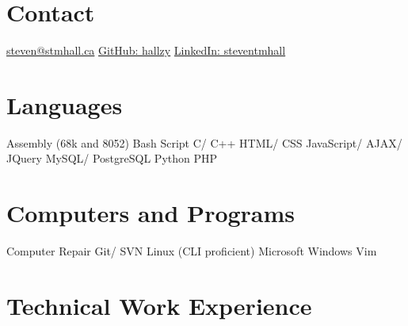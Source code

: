 \documentclass[]{friggeri-cv} %
\begin{document}


\begin{aside} %
\section{Contact}
\href{mailto:steven@stmhall.ca}{steven@stmhall.ca}
\href{http://github.com/hallzy}{GitHub: hallzy}
\href{https://www.linkedin.com/in/steventmhall}{LinkedIn: steventmhall}
\section{Languages}
Assembly (68k and 8052)
Bash Script
C/ C++
HTML/ CSS
JavaScript/ AJAX/ JQuery
MySQL/ PostgreSQL
Python
PHP
\section{Computers and Programs}
Computer Repair
Git/ SVN
Linux (CLI proficient)
Microsoft Windows
Vim
\end{aside}

\section{Technical Work Experience}
\end{document}

